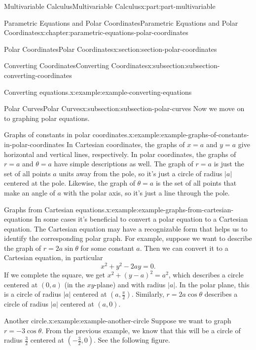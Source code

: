 \documentclass[twoside,10pt,]{tufte-book}
\numberwithin{equation}{part}
\begin{document}
\begin{partptx}{Multivariable Calculus}{}{Multivariable Calculus}{}{}{x:part:part-multivariable}
\begin{chapterptx}{Parametric Equations and Polar Coordinates}{}{Parametric Equations and Polar Coordinates}{}{}{x:chapter:parametric-equations-polar-coordinates}
\begin{sectionptx}{Polar Coordinates}{}{Polar Coordinates}{}{}{x:section:section-polar-coordinates}
\begin{subsectionptx}{Converting Coordinates}{}{Converting Coordinates}{}{}{x:subsection:subsection-converting-coordinates}
\begin{example}{Converting equations.}{x:example:example-converting-equations}
\begin{equation*}
\end{equation*}
\end{example}
\end{subsectionptx}
%
%
\typeout{************************************************}
\typeout{************************************************}
%
\begin{subsectionptx}{Polar Curves}{}{Polar Curves}{}{}{x:subsection:subsection-polar-curves}
Now we move on to graphing polar equations.%
\begin{example}{Graphs of constants in polar coordinates.}{x:example:example-graphs-of-constants-in-polar-coordinates}%
In Cartesian coordinates, the graphs of \(x=a\) and \(y=a\) give horizontal and vertical lines, respectively. In polar coordinates, the graphs of \(r=a\) and \(\theta=a\) have simple descriptions as well. The graph of \(r=a\) is just the set of all points \(a\) units away from the pole, so it's just a circle of radius \(|a|\) centered at the pole. Likewise, the graph of \(\theta = a\) is the set of all points that make an angle of \(a\) with the polar axis, so it's just a line through the pole.%
\end{example}
\begin{example}{Graphs from Cartesian equations.}{x:example:example-graphs-from-cartesian-equations}%
In some cases it's beneficial to convert a polar equation to a Cartesian equation. The Cartesian equation may have a recognizable form that helps us to identify the corresponding polar graph. For example, suppose we want to describe the graph of \(r = 2a\sin\theta\) for some constant \(a\). Then we can convert it to a Cartesian equation, in particular%
%
\begin{equation*}
x^{2}+y^{2} - 2ay = 0.
\end{equation*}
If we complete the square, we get \(x^{2}+(y-a)^{2} = a^{2}\), which describes a circle centered at \((0,a)\) (in the \(xy\)-plane) and with radius \(|a|\). In the polar plane, this is a circle of radius \(|a|\) centered at \((a,\frac{\pi}{2}).\) Similarly, \(r=2a\cos\theta\) describes a circle of radius \(|a|\) centered at \((a,0)\).%
\end{example}
\begin{example}{Another circle.}{x:example:example-another-circle}%
Suppose we want to graph \(r=-3\cos\theta\). From the previous example, we know that this will be a circle of radius \(\frac{3}{2}\) centered at \((-\frac{3}{2},0)\). See the following figure.%
\end{example}

\end{subsectionptx}
\end{sectionptx}
\end{chapterptx}
\end{partptx}
\end{document}
